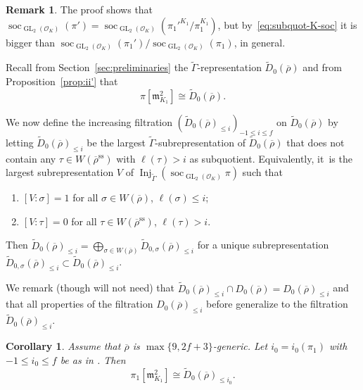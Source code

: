 \documentclass[JEP,XML,SOM,Unicode,NoFloatCountersInSection, NoEqCountersInSection,published]{cedram}
\let\wt\widetilde
\newcommand{\cO}{\mathcal{O}}
\renewcommand{\ss}{\mathrm{ss}}
\newcommand{\fm}{\mathfrak{m}}\let\m\fm
\newcommand{\brho}{\overline{\rho}}
\DeclareMathOperator{\GL}{GL}
\DeclareMathOperator{\Inj}{Inj}
\DeclareMathOperator{\soc}{soc}
\theoremstyle{plain}
\newtheorem{cor}[prop]{Corollary}
\theoremstyle{definition}
\newtheorem{rem}[prop]{Remark}
\begin{document}
\begin{rem}\label{rem:subquot-K-soc}
The proof shows that $\soc_{\GL_2(\cO_K)}(\pi') = \soc_{\GL_2(\cO_K)}(\pi_1'^{K_1}/\pi_1^{K_1})$, but by~\eqref{eq:subquot-K-soc} it is bigger than $\soc_{\GL_2(\cO_K)}(\pi_1')/\soc_{\GL_2(\cO_K)}(\pi_1)$, in general.
\end{rem}

Recall from Section~\ref{sec:preliminaries} the $\wt{\Gamma}$-representation $\wt{D}_0(\brho)$ and from Proposition~\ref{prop:ii'} that
\[
\pi[\fm_{K_1}^2]\cong \wt{D}_0(\brho).
\]

We now define the increasing filtration $(\wt{D}_0(\brho)_{\le i})_{-1 \le i \le f}$ on $\wt{D}_0(\brho)$ by letting $\wt{D}_0(\brho)_{\le i}$ be the largest $\wt\Gamma$-subrepresentation of $\wt{D}_0(\brho)$ that does not contain any $\tau \in W(\brho^\ss)$ with $\ell(\tau) > i$ as subquotient.
Equivalently, it~is the largest subrepresentation $V$ of $\Inj_{\wt\Gamma} (\soc_{\GL_2(\cO_K)} \pi)$ such that
\begin{enumerate}
\item $[V: \sigma] = 1$ for all $\sigma \in W(\brho)$, $\ell(\sigma) \le i$;
\item $[V: \tau] = 0$ for all $\tau \in W(\brho^\ss)$, $\ell(\tau) > i$.
\end{enumerate}
Then $\wt{D}_0(\brho)_{\le i} = \bigoplus_{\sigma \in W(\brho)} \wt{D}_{0,\sigma}(\brho)_{\le i}$ for a unique subrepresentation $\wt{D}_{0,\sigma}(\brho)_{\le i} \subset \wt{D}_{0}(\brho)_{\le i}$.

We remark (though will not need) that $\wt D_0(\brho)_{\le i} \cap D_0(\brho) = D_0(\brho)_{\le i}$ and that
all properties of the filtration $D_0(\brho)_{\le i}$ before \cite[Lem.\,4.3.14]{BHHMS4} generalize to the filtration $\wt D_0(\brho)_{\le i}$.

\begin{cor}\label{cor:pi1-mK1-squared}
{Assume that $\brho$ is $\max\{9,2f+3\}$-generic.}
Let $i_0 = i_0(\pi_1)$ with $-1 \le i_0 \le f$ be as in \cite[Th.\,4.3.15]{BHHMS4}.
Then
\begin{equation*}
\pi_1[\m_{K_1}^2] \cong \wt{D}_0(\brho)_{\le i_0}.
\end{equation*}
\end{cor}
\end{document}
